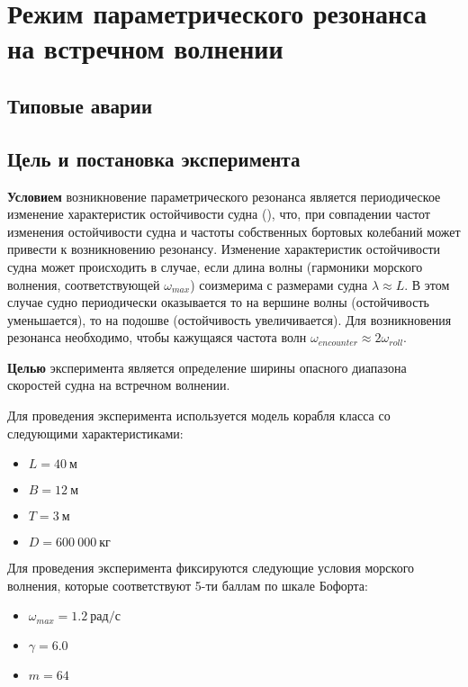 \section{Режим параметрического резонанса на встречном волнении}

\subsection{Типовые аварии}


\subsection{Цель и постановка эксперимента}

\textbf{Условием} возникновение параметрического резонанса является периодическое изменение характеристик остойчивости судна (), что, при совпадении частот изменения остойчивости судна и частоты собственных бортовых колебаний может привести к возникновению резонансу.
Изменение характеристик остойчивости судна может происходить в случае, если длина волны (гармоники морского волнения, соответствующей $\omega_{max}$) соизмерима с размерами судна $\lambda \approx L$. В этом случае судно периодически оказывается то на вершине волны (остойчивость уменьшается), то на подошве (остойчивость увеличивается). Для возникновения резонанса необходимо, чтобы кажущаяся частота волн $\omega_{encounter} \approx 2\omega_{roll}$.

\textbf{Целью} эксперимента является определение ширины опасного диапазона скоростей судна на встречном волнении.

Для проведения эксперимента используется модель корабля класса  со следующими характеристиками:
\begin{itemize}
	\item	$L = 40\ \text{м}$
	\item	$B = 12\ \text{м}$
	\item	$T = 3\ \text{м}$
	\item	$D = 600\ 000\ \text{кг}$
\end{itemize}

Для проведения эксперимента фиксируются следующие условия морского волнения, которые соответствуют 5-ти баллам по шкале Бофорта:
\begin{itemize}
	\item	$\omega_{max} = 1.2\ \text{рад/с}$
	\item	$\gamma = 6.0$
	\item	$m = 64$
\end{itemize}

